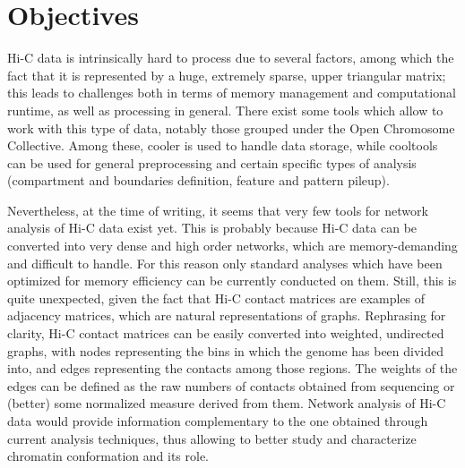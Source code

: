 \graphicspath{{chapters/03_objectives/}}
\chapter{Objectives}


Hi-C data is intrinsically hard to process due to several factors, among which the fact that it is represented by a huge, extremely sparse, upper triangular matrix; this leads to challenges both in terms of memory management and computational runtime, as well as processing in general. There exist some tools which allow to work with this type of data, notably those grouped under the Open Chromosome Collective\cite{openchromosomecollective}. Among these, cooler\cite{cooler2020} is used to handle data storage, while cooltools\cite{cooltools2022} can be used for general preprocessing and certain specific types of analysis (compartment and boundaries definition, feature and pattern pileup). 

Nevertheless, at the time of writing, it seems that very few tools for network analysis of Hi-C data exist yet\cite{chromatinnetworks2023}. This is probably because Hi-C data can be converted into very dense and high order networks, which are memory-demanding and difficult to handle. For this reason only standard analyses which have been optimized for memory efficiency can be currently conducted on them. Still, this is quite unexpected, given the fact that Hi-C contact matrices are examples of adjacency matrices, which are natural representations of graphs. Rephrasing for clarity, Hi-C contact matrices can be easily converted into weighted, undirected graphs, with nodes representing the bins in which the genome has been divided into, and edges representing the contacts among those regions. The weights of the edges can be defined as the raw numbers of contacts obtained from sequencing or (better) some normalized measure derived from them. Network analysis of Hi-C data would provide information complementary to the one obtained through current analysis techniques, thus allowing to better study and characterize chromatin conformation and its role. 

